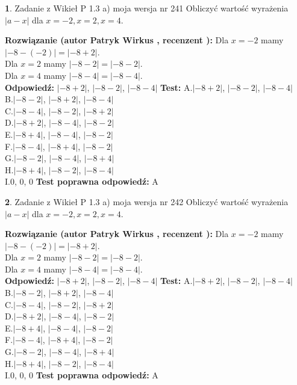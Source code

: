 \documentclass[12pt, a4paper]{article}
\theoremstyle{definition} %
\newtheorem{zad}{}
\newcommand{\zadStart}[1]{\begin{zad}#1\newline}
\newcommand{\zadStop}{\end{zad}}
\newcommand{\rozwStart}[2]{\noindent \textbf{Rozwiązanie (autor #1 , recenzent #2): }\newline}
\newcommand{\rozwStop}{\newline}
\newcommand{\odpStart}{\noindent \textbf{Odpowiedź:}\newline}
\newcommand{\odpStop}{\newline}
\newcommand{\testStart}{\noindent \textbf{Test:}\newline}
\newcommand{\testStop}{\newline}
\newcommand{\kluczStart}{\noindent \textbf{Test poprawna odpowiedź:}\newline}
\newcommand{\kluczStop}{\newline}
\begin{document}
\zadStart{Zadanie z Wikieł P 1.3 a) moja wersja nr 241}
Obliczyć wartość wyrażenia $|a - x|$ dla $x=-2,x=2,x=4$.
\zadStop
\rozwStart{Patryk Wirkus}{}
Dla $x = -2$ mamy $|-8 - (-2)| = |-8 + 2|$.\\
Dla $x = 2$ mamy $|-8 - 2| = |-8 - 2|$.\\
Dla $x = 4$ mamy $|-8 - 4| = |-8 - 4|$.\\
\rozwStop
\odpStart
$|-8 + 2|$, $|-8 - 2|$, $|-8 - 4|$
\odpStop
\testStart
A.$|-8 + 2|$, $|-8 - 2|$, $|-8 - 4|$\\
B.$|-8 - 2|$, $|-8 + 2|$, $|-8 - 4|$\\
C.$|-8 - 4|$, $|-8 - 2|$, $|-8 + 2|$\\
D.$|-8 + 2|$, $|-8 - 4|$, $|-8 - 2|$\\
E.$|-8 + 4|$, $|-8 - 4|$, $|-8 - 2|$\\
F.$|-8 - 4|$, $|-8 + 4|$, $|-8 - 2|$\\
G.$|-8 - 2|$, $|-8 - 4|$, $|-8 + 4|$\\
H.$|-8 + 4|$, $|-8 - 2|$, $|-8 - 4|$\\
I.$0$, $0$, $0$
\testStop
\kluczStart
A
\kluczStop



\zadStart{Zadanie z Wikieł P 1.3 a) moja wersja nr 242}
Obliczyć wartość wyrażenia $|a - x|$ dla $x=-2,x=2,x=4$.
\zadStop
\rozwStart{Patryk Wirkus}{}
Dla $x = -2$ mamy $|-8 - (-2)| = |-8 + 2|$.\\
Dla $x = 2$ mamy $|-8 - 2| = |-8 - 2|$.\\
Dla $x = 4$ mamy $|-8 - 4| = |-8 - 4|$.\\
\rozwStop
\odpStart
$|-8 + 2|$, $|-8 - 2|$, $|-8 - 4|$
\odpStop
\testStart
A.$|-8 + 2|$, $|-8 - 2|$, $|-8 - 4|$\\
B.$|-8 - 2|$, $|-8 + 2|$, $|-8 - 4|$\\
C.$|-8 - 4|$, $|-8 - 2|$, $|-8 + 2|$\\
D.$|-8 + 2|$, $|-8 - 4|$, $|-8 - 2|$\\
E.$|-8 + 4|$, $|-8 - 4|$, $|-8 - 2|$\\
F.$|-8 - 4|$, $|-8 + 4|$, $|-8 - 2|$\\
G.$|-8 - 2|$, $|-8 - 4|$, $|-8 + 4|$\\
H.$|-8 + 4|$, $|-8 - 2|$, $|-8 - 4|$\\
I.$0$, $0$, $0$
\testStop
\kluczStart
A
\kluczStop
\end{document}
